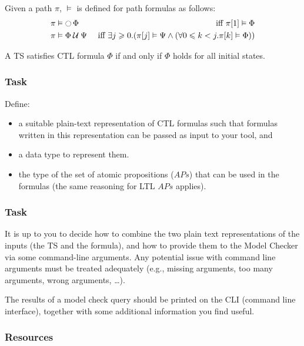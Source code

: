 \documentclass{article}
\begin{document}
Given a path $\pi$, $\vDash$ is defined for path formulas as follows: 
\begin{align*}
    & \pi \vDash \mathop{\ocircle}{\Phi} & \text{ iff } \pi[1]  \vDash \Phi \\ 
    & \pi \vDash \Phi \mathbin{\mathcal{U}} \Psi & \text{ iff } \exists j \geqslant 0. (\pi[j]  \vDash \Psi \land (\forall 0 \leqslant k < j. \pi[k]  \vDash \Phi))
\end{align*}

A TS satisfies CTL formula $\Phi$ if and only if $\Phi$ holds for all initial states.

\subsubsection*{Task}
Define:
\begin{itemize}
    \item a suitable plain-text representation of CTL formulas such that formulas written in this representation can be passed as input to your tool, and 
    \item a data type to represent them.
    \item the type of the set of atomic propositions ($APs$) that can be used in the formulas (the same reasoning for LTL $APs$ applies).
\end{itemize}

\subsubsection*{Task}
It is up to you to decide how to combine the two plain text representations of the inputs (the TS and the formula), and how to provide them to the Model Checker via some command-line arguments. Any potential issue with command line arguments must be treated adequately (e.g., missing arguments, too many arguments, wrong arguments, \dots).

The results of a model check query should be printed on the CLI (command line interface), together with some additional information you find useful.

\subsubsection*{Resources}
\cite[Paragraph 6.2 (in particular 6.1.1 and 6.1.2)]{BaKa}
\end{document}
